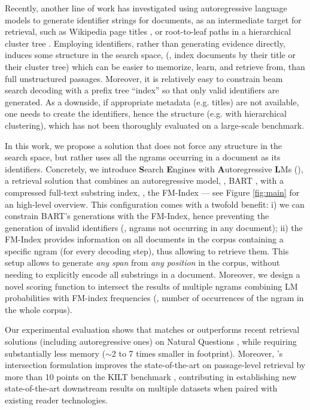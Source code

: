 Recently, another line of work has investigated using autoregressive language models to generate identifier strings for documents, as an intermediate target for retrieval, such as Wikipedia page titles \citep{decao-etal-2021-autoregressive}, or root-to-leaf paths in a hierarchical cluster tree \citep{tay-etal-2022-transformer}. 
Employing identifiers, rather than generating evidence directly, induces some structure in the search space, (\ie, index documents by their title or their cluster tree) which can be easier to memorize, learn, and retrieve from, than full unstructured passages.
Moreover, it is relatively easy to constrain beam search decoding with a prefix tree ``index'' so that only valid identifiers are generated. As a downside, if appropriate metadata (e.g. titles) are not available, one needs to create the identifiers, hence the structure (e.g. with hierarchical clustering), which has not been thoroughly evaluated on a large-scale benchmark.


In this work, we propose a solution that does not force any structure in the search space, but rather uses all the ngrams occurring in a document as its identifiers.
Concretely, we introduce \textbf{S}earch \textbf{E}ngines with \textbf{A}utoregressive \textbf{L}Ms (\system{}), a retrieval solution that combines an autoregressive model, \ie, BART \citep{Lewis2019BARTDS}, with a compressed full-text substring index, \ie, the FM-Index \citep{ferragina-manzini-2000-opportunistic} --- see Figure \ref{fig:main} for an high-level overview. 
This configuration comes with a twofold benefit: i) we can constrain BART's generations with the FM-Index, hence preventing the generation of invalid identifiers (\ie, ngrams not occurring in any document); ii) the FM-Index provides information on all documents in the corpus containing a specific ngram (for every decoding step), thus allowing to retrieve them.
This setup allows \system{} to generate \emph{any span} from \emph{any position} in the corpus, without needing to explicitly encode all substrings in a document.
Moreover, we design a novel scoring function to intersect the results of multiple ngrams combining LM probabilities with FM-index frequencies (\ie, number of occurrences of the ngram in the whole corpus).%

Our experimental evaluation shows that \system{} matches or outperforms recent retrieval solutions (including autoregressive ones) on Natural Questions \cite{kwiatkowski-etal-2019-natural}, while requiring substantially less memory ($\sim$2 to 7 times smaller in footprint). Moreover, \system{}'s intersection formulation improves the state-of-the-art on passage-level retrieval by more than 10 points on the KILT benchmark \cite{petroni-etal-2021-kilt}, contributing in establishing new state-of-the-art downstream results on multiple datasets when paired with existing reader technologies. 
